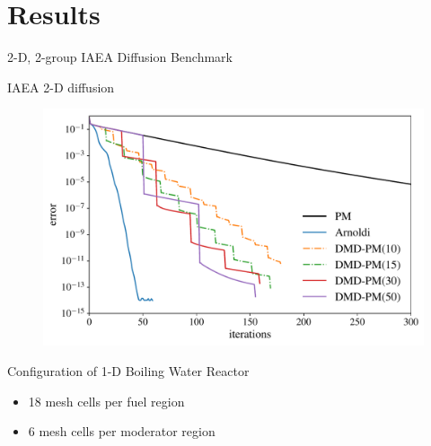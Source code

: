 \documentclass[fleqn]{beamer}
\begin{document}
\section{Results}
\begin{frame}{2-D, 2-group IAEA Diffusion Benchmark\footnotemark}
    \begin{figure}
        \centering
        
    \end{figure}
\end{frame}

\begin{frame}{IAEA 2-D diffusion}
    \begin{figure}
        \centering
        \includegraphics[height=0.69\paperheight]{figures/dmdpi_semilog.pdf}
    \end{figure}
\end{frame}

\begin{frame}{Configuration of 1-D Boiling Water Reactor \footnotemark}
    \begin{figure}
        \centering
        \begin{minipage}[c]{\textwidth}
            \centering
            
        \end{minipage}
        \begin{minipage}[c]{\textwidth}
            \centering
            
        \end{minipage}
        \begin{minipage}[c]{\textwidth}
            \centering
            
        \end{minipage}
    \end{figure}
    \begin{itemize}
        \item 18 mesh cells per fuel region
        \item 6 mesh cells per moderator region
    \end{itemize}
\end{frame}
\end{document}
